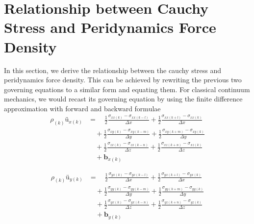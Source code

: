 \documentclass[a4paper,11pt,CJK]{paper}
\begin{document}
\section{Relationship between Cauchy Stress and Peridynamics Force Density}
In this section, we derive the relationship between the cauchy stress and peridynamics force density.
This can be achieved by rewriting the previous two governing equations to a similar form and equating them.
For classical continuum mechanics, we would recast its governing equation by using the finite difference approximation with forward and backward formulae
\begin{equation}
\begin{aligned}
\rho_{(k)}\textbf{\"u}_{x(k)} &= \quad \frac{1}{2}\frac{\sigma_{xx(k)} - \sigma_{xx(k-l)}}{\Delta x} + \frac{1}{2}\frac{\sigma_{xx(k+l)} - \sigma_{xx(k)}}{\Delta x}\\
                              &\quad+  \frac{1}{2}\frac{\sigma_{xy(k)} - \sigma_{xy(k-m)}}{\Delta y} + \frac{1}{2}\frac{\sigma_{xy(k+m)} - \sigma_{xy(k)}}{\Delta y}\\
                              &\quad+  \frac{1}{2}\frac{\sigma_{zx(k)} - \sigma_{zx(k-n)}}{\Delta z} + \frac{1}{2}\frac{\sigma_{xz(k+n)} - \sigma_{xz(k)}}{\Delta z}\\
                              &\quad + \textbf{b}_{x(k)}
\end{aligned}
\end{equation}

\begin{equation}
\begin{aligned}
\rho_{(k)}\textbf{\"u}_{y(k)} &= \quad \frac{1}{2}\frac{\sigma_{yx(k)} - \sigma_{yx(k-l)}}{\Delta x} + \frac{1}{2}\frac{\sigma_{yx(k+l)} - \sigma_{yx(k)}}{\Delta x}\\
                              &\quad+  \frac{1}{2}\frac{\sigma_{yy(k)} - \sigma_{yy(k-m)}}{\Delta y} + \frac{1}{2}\frac{\sigma_{yy(k+m)} - \sigma_{yy(k)}}{\Delta y}\\
                              &\quad+  \frac{1}{2}\frac{\sigma_{yx(k)} - \sigma_{yx(k-n)}}{\Delta z} + \frac{1}{2}\frac{\sigma_{yz(k+n)} - \sigma_{yz(k)}}{\Delta z}\\
                              &\quad + \textbf{b}_{y(k)}
\end{aligned}
\end{equation}
\end{document}
